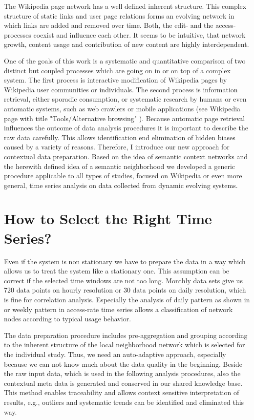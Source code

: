 \documentclass[a4paper,10pt]{scrbook}
\begin{document}
The Wikipedia page network has a well defined inherent structure. This complex structure of static links and user page relations forms an evolving network in which links are added and removed over time. Both, the edit- and the access-processes coexist and influence each other. It seems to be intuitive, that network growth, content usage and contribution of new content are highly interdependent. 

One of the goals of this work is a systematic and quantitative comparison of two distinct but coupled processes which are going on in or on top of a complex system. The first process is interactive modification of Wikipedia pages by Wikipedia user communities or individuals. The second process is information retrieval, either sporadic consumption, or systematic research by humans or even automatic systems, such as web crawlers or mobile applications (see Wikipedia page with title "Tools/Alternative browsing" \cite{WIKIPEDIA.Mobile.App}). Because automatic page retrieval influences the outcome of data analysis procedures it is important to describe the raw data carefully. This allows identification end elimination of hidden biases caused by a variety of reasons. Therefore, I introduce our new approach for contextual data preparation. Based on the idea of semantic context networks and the herewith defined idea of a semantic neighborhood we developed a generic procedure applicable to all types of studies, focused on Wikipedia or even more general, time series analysis on data collected from dynamic evolving systems.

\section{How to Select the Right Time Series?}
Even if the system is non stationary we have to prepare the data in a way which allows us to treat the system like a stationary one. This assumption can be correct if the selected time windows are not too long. Monthly data sets give us 720 data points on hourly resolution or 30 data points on daily resolution, which is fine for correlation analysis. Especially the analysis of daily pattern as shown in \cite{2013arXiv1308.1776S} or weekly pattern in access-rate time series allows a classification of network nodes according to typical usage behavior. 

The data preparation procedure includes pre-aggregation and grouping according to the inherent structure of the local neighborhood network which is selected for the individual study. Thus, we need an auto-adaptive approach, especially because we can not know much about the data quality in the beginning. Beside the raw input data, which is used in the following analysis procedures, also the contextual meta data is generated and conserved in our shared knowledge base. This method enables traceability and allows context sensitive interpretation of results, e.g., outliers and systematic trends can be identified and eliminated this way. 
\end{document}
